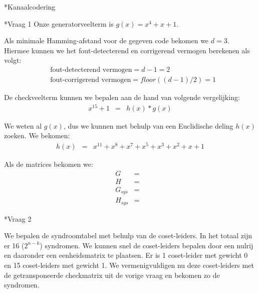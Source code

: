 \documentclass[]{article}
\begin{document}
\begin{section}*{Kanaalcodering}

    \begin{subsection}*{Vraag 1}
        Onze generatorveelterm is $g(x) = x^4 + x + 1$.

        Als minimale Hamming-afstand voor de gegeven code bekomen we
        $d=3$. Hiermee kunnen we het fout-detecterend en corrigerend
        vermogen berekenen als volgt:
        \begin{eqnarray*}
            & \text{fout-detecterend vermogen} = d-1 = 2 \\
            & \text{fout-corrigerend vermogen} = floor((d-1)/2) = 1
        \end{eqnarray*}

        De checkveelterm kunnen we bepalen aan de hand van volgende
        vergelijking:
        \begin{eqnarray*}
            x^{15} + 1 &=& h(x) * g(x)
        \end{eqnarray*}

        We weten al $g(x)$, dus we kunnen met behulp van een
        Euclidische deling $h(x)$ zoeken. We bekomen:
        \begin{eqnarray*}
            h(x) &=& x^{11} + x^8 + x^7 + x^5 + x^3 + x^2 + x + 1
        \end{eqnarray*}

        Als de matrices bekomen we:
        \begin{eqnarray*}
            G &=&\\
            H &=&\\
            G_{sys} &=&\\
            H_{sys} &=&
        \end{eqnarray*}

    \end{subsection}

    \begin{subsection}*{Vraag 2} %

        We bepalen de syndroomtabel met behulp van de coset-leiders.
        In het totaal zijn er 16 ($2^{n-k}$) syndromen. We kunnen snel
        de coset-leiders bepalen door een nulrij en daaronder een
        eenheidsmatrix te plaatsen. Er is 1 coset-leider met gewicht
        0 en 15 coset-leiders met gewicht 1. We vermenigvuldigen nu
        deze coset-leiders met de getransponeerde checkmatrix uit de
        vorige vraag en bekomen zo de syndromen.


\end{subsection}
\end{section}
\end{document}
